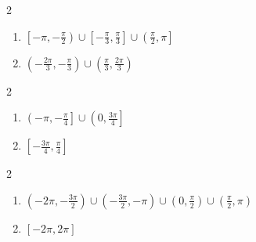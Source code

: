 \documentclass{ximera}
\begin{document}
\begin{multicols}{2}

\begin{enumerate}

\setcounter{enumi}{\value{HW}}

\item $\left[ -\pi, -\frac{\pi}{2} \right) \cup \left[ -\frac{\pi}{3}, \frac{\pi}{3} \right] \cup \left( \frac{\pi}{2}, \pi \right]$ 
\item $\left( -\frac{2\pi}{3}, -\frac{\pi}{3} \right) \cup \left( \frac{\pi}{3}, \frac{2\pi}{3} \right)$

\setcounter{HW}{\value{enumi}}

\end{enumerate}

\end{multicols}

\begin{multicols}{2}

\begin{enumerate}

\setcounter{enumi}{\value{HW}}

\item $\left( -\pi, -\frac{\pi}{4} \right] \cup \left( 0, \frac{3\pi}{4} \right]$
\item $\left[ -\frac{3\pi}{4}, \frac{\pi}{4} \right]$

\setcounter{HW}{\value{enumi}}

\end{enumerate}

\end{multicols}

\begin{multicols}{2}

\begin{enumerate}

\setcounter{enumi}{\value{HW}}

\item \small $\left( -2\pi, -\frac{3\pi}{2} \right) \cup \left( -\frac{3\pi}{2}, -\pi \right) \cup \left( 0, \frac{\pi}{2} \right) \cup \left( \frac{\pi}{2}, \pi \right)$ \normalsize
\item  $[-2\pi, 2\pi]$ 

\setcounter{HW}{\value{enumi}}

\end{enumerate}

\end{multicols}
\end{document}
